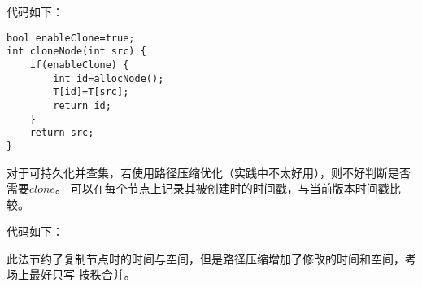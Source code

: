 代码如下：
\begin{lstlisting}[title=cloneA]
bool enableClone=true;
int cloneNode(int src) {
    if(enableClone) {
        int id=allocNode();
        T[id]=T[src];
        return id;
    }
    return src;
}
\end{lstlisting}

对于可持久化并查集，若使用路径压缩优化（实践中不太好用），则不好判断是否需要$clone$。
可以在每个节点上记录其被创建时的时间戳，与当前版本时间戳比较。

代码如下：

此法节约了复制节点时的时间与空间，但是路径压缩增加了修改的时间和空间，考场上最好只写
按秩合并。
